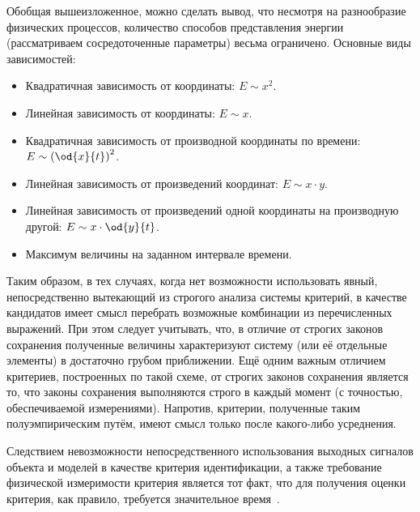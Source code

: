 Обобщая вышеизложенное, можно сделать вывод, что
несмотря на разнообразие физических процессов, количество способов
представления энергии (рассматриваем сосредоточенные параметры)
весьма ограничено. Основные виды зависимостей:

\begin{itemize}

  \item
    Квадратичная зависимость от координаты: $E \sim x^2$.

  \item
    Линейная зависимость от координаты: $E \sim x$.

  \item
    Квадратичная зависимость от производной координаты по времени: $E \sim \left( \od{x}{t}\right)^2$.

  \item
    Линейная зависимость от произведений координат: $E \sim x \cdot y$.

  \item
    Линейная зависимость от произведений одной координаты на производную другой: $E \sim x \cdot \od{y}{t}$.

  \item
    Максимум величины на заданном интервале времени.

\end{itemize}

Таким образом, в тех случаях, когда нет возможности
использовать явный, непосредственно вытекающий
из строгого анализа системы критерий, в качестве кандидатов
имеет смысл перебрать возможные комбинации из перечисленных выражений.
При этом следует учитывать, что, в отличие от строгих законов сохранения
полученные величины характеризуют систему (или её отдельные элементы)
в достаточно грубом приближении.
Ещё одним важным отличием критериев, построенных по такой схеме,
от строгих законов сохранения является то,
что законы сохранения выполняются строго в каждый момент
(с точностью, обеспечиваемой измерениями). Напротив,
критерии, полученные таким полуэмпирическим путём,
имеют смысл только после какого-либо усреднения.








Следствием невозможности непосредственного использования выходных
сигналов объекта и моделей в качестве критерия идентификации, а также
требование физической измеримости критерия является
тот факт, что для получения оценки критерия, как правило,
требуется значительное время~\cite{atu_ich2011,atu_DSMP2016}. %






